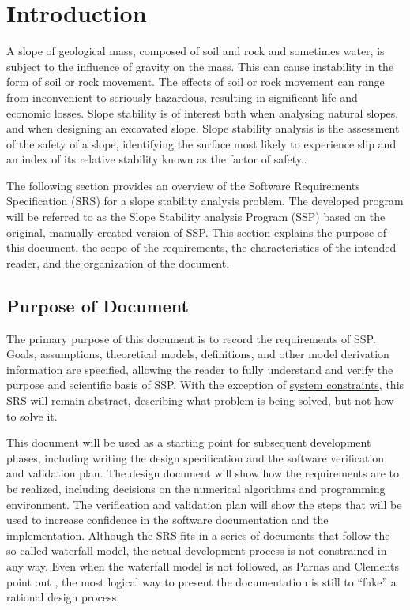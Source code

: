 \documentclass[12pt]{article}
\begin{document}
\section{Introduction}
\label{Sec:Intro}
A slope of geological mass, composed of soil and rock and sometimes water, is subject to the influence of gravity on the mass. This can cause instability in the form of soil or rock movement. The effects of soil or rock movement can range from inconvenient to seriously hazardous, resulting in significant life and economic losses. Slope stability is of interest both when analysing natural slopes, and when designing an excavated slope. Slope stability analysis is the assessment of the safety of a slope, identifying the surface most likely to experience slip and an index of its relative stability known as the factor of safety..

The following section provides an overview of the Software Requirements Specification (SRS) for a slope stability analysis problem. The developed program will be referred to as the Slope Stability analysis Program (SSP) based on the original, manually created version of \hyperref{https://github.com/smiths/caseStudies/blob/master/CaseStudies/ssp}{}{}{SSP}. This section explains the purpose of this document, the scope of the requirements, the characteristics of the intended reader, and the organization of the document.

\subsection{Purpose of Document}
\label{Sec:DocPurpose}
The primary purpose of this document is to record the requirements of SSP. Goals, assumptions, theoretical models, definitions, and other model derivation information are specified, allowing the reader to fully understand and verify the purpose and scientific basis of SSP. With the exception of \hyperref[Sec:SysConstraints]{system constraints}, this SRS will remain abstract, describing what problem is being solved, but not how to solve it.

This document will be used as a starting point for subsequent development phases, including writing the design specification and the software verification and validation plan. The design document will show how the requirements are to be realized, including decisions on the numerical algorithms and programming environment. The verification and validation plan will show the steps that will be used to increase confidence in the software documentation and the implementation. Although the SRS fits in a series of documents that follow the so-called waterfall model, the actual development process is not constrained in any way. Even when the waterfall model is not followed, as Parnas and Clements point out \cite{parnasClements1986}, the most logical way to present the documentation is still to ``fake'' a rational design process.
\end{document}
